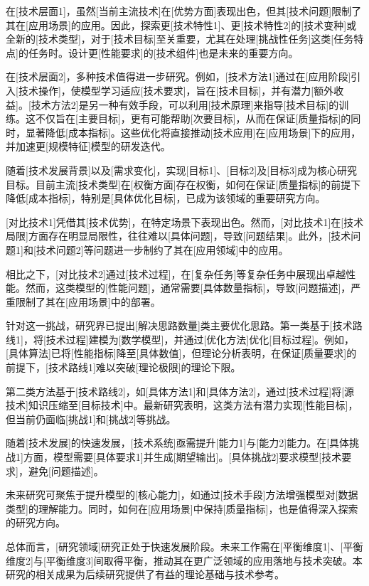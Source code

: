 在[技术层面1]，虽然[当前主流技术]在[优势方面]表现出色，但其[技术问题]限制了其在[应用场景]的应用。因此，探索更[技术特性1]、更[技术特性2]的[技术变种]或全新的[技术类型]，对于[技术目标]至关重要，尤其在处理[挑战性任务]这类[任务特点]的任务时。设计更[性能要求]的[技术组件]也是未来的重要方向。

在[技术层面2]，多种技术值得进一步研究。例如，[技术方法1]通过在[应用阶段]引入[技术操作]，使模型学习适应[技术要求]，旨在[技术目标]，并有潜力[额外收益]。[技术方法2]是另一种有效手段，可以利用[技术原理]来指导[技术目标]的训练。这不仅旨在[主要目标]，更有可能帮助[次要目标]，从而在保证[质量指标]的同时，显著降低[成本指标]。这些优化将直接推动[技术应用]在[应用场景]下的应用，并加速更[规模特征]模型的研发迭代。

{\heiti [展望方向2]}
随着[技术发展背景]以及[需求变化]，实现[目标1]、[目标2]及[目标3]成为核心研究目标。目前主流[技术类型]在[权衡方面]存在权衡，如何在保证[质量指标]的前提下降低[成本指标]，特别是[具体优化目标]，已成为该领域的重要研究方向。

[对比技术1]凭借其[技术优势]，在特定场景下表现出色。然而，[对比技术1]在[技术局限]方面存在明显局限性，往往难以[具体问题]，导致[问题结果]。此外，[技术问题1]和[技术问题2]等问题进一步制约了其在[应用领域]中的应用。

相比之下，[对比技术2]通过[技术过程]，在[复杂任务]等复杂任务中展现出卓越性能。然而，这类模型的[性能问题]，通常需要[具体数量指标]，导致[问题描述]，严重限制了其在[应用场景]中的部署。

针对这一挑战，研究界已提出[解决思路数量]类主要优化思路。第一类基于[技术路线1]，将[技术过程]建模为[数学模型]，并通过[优化方法]优化[目标过程]。例如，[具体算法]已将[性能指标]降至[具体数值]，但理论分析表明，在保证[质量要求]的前提下，[技术路线1]难以突破[理论极限]的理论下限。

第二类方法基于[技术路线2]，如[具体方法1]和[具体方法2]，通过[技术过程]将[源技术]知识压缩至[目标技术]中。最新研究表明，这类方法有潜力实现[性能目标]，但当前仍面临[挑战1]和[挑战2]等挑战。

{\heiti [展望方向3]}
随着[技术发展]的快速发展，[技术系统]亟需提升[能力1]与[能力2]能力。在[具体挑战1]方面，模型需要[具体要求1]并生成[期望输出]。[具体挑战2]要求模型[技术要求]，避免[问题描述]。

未来研究可聚焦于提升模型的[核心能力]，如通过[技术手段]方法增强模型对[数据类型]的理解能力。同时，如何在[应用场景]中保持[质量指标]，也是值得深入探索的研究方向。

总体而言，[研究领域]研究正处于快速发展阶段。未来工作需在[平衡维度1]、[平衡维度2]与[平衡维度3]间取得平衡，推动其在更广泛领域的应用落地与技术突破。本研究的相关成果为后续研究提供了有益的理论基础与技术参考。